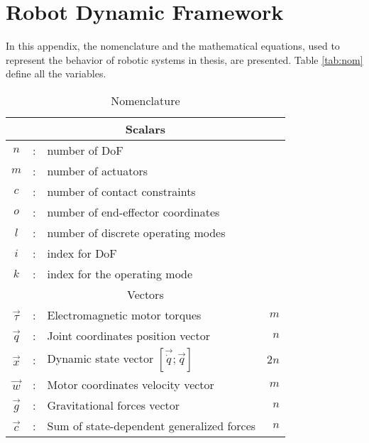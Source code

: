 \chapter{Robot Dynamic Framework}
\label{sec:robotdynamic}

In this appendix, the nomenclature and the mathematical equations, used to represent the behavior of robotic systems in thesis, are presented. Table \ref{tab:nom} define all the variables.

\begin{table}[htbp]
	\centering
	\caption{Nomenclature}	%
		\begin{tabular}{ c c l r }
        \hline \hline
				\multicolumn{4}{c}{Scalars} \\
				\hline \hline
			$n$             &  :  & number of DoF                                              & \\
			$m$             &  :  & number of actuators                                        & \\
			$c$             &  :  & number of contact constraints                              & \\
			$o$             &  :  & number of end-effector coordinates                         & \\ 
			$l$             &  :  & number of discrete operating modes                         & \\ 
			$i$             &  :  & index for DoF                                              & \\
			$k$             &  :  & index for the operating mode                               & \\ 
			\hline \hline
			\multicolumn{4}{c}{Vectors} \\
			\hline \hline
			$\vec{\tau}$    &  :  & Electromagnetic motor torques                              & $m$  \\
			$\vec{q}$       &  :  & Joint coordinates position vector                          & $n$  \\
			$\vec{x}$       &  :  & Dynamic state vector $[\vec{\dot{q}} ;\vec{q}]$            & $2n$  \\
			$\vec{w}$       &  :  & Motor coordinates velocity vector                          & $m$  \\ 
			$\vec{g}$       &  :  & Gravitational forces vector                                & $n$  \\
			$\vec{c}$       &  :  & Sum of state-dependent generalized forces                  & $n$  \\

\end{tabular}
\end{table}
